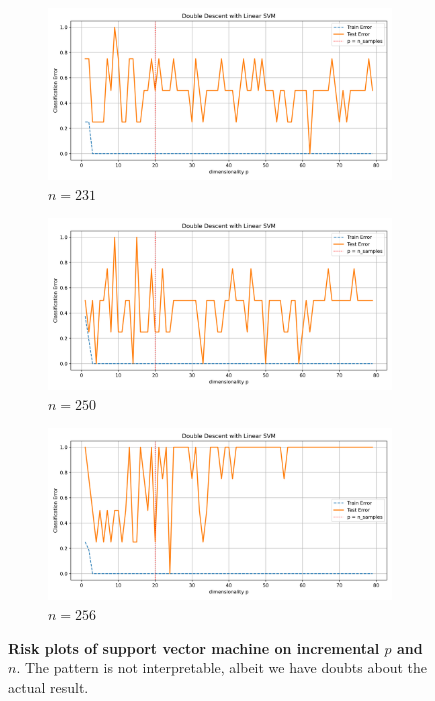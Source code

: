\documentclass{article}
\begin{document}
\begin{figure}[htb]
  \begin{subfigure}[b]{\imgwidth}
    \includegraphics[width=\linewidth]{img_qq/risk_curve_n150.png}
    \caption{$n=231$}\label{fig:2m1}
  \end{subfigure}%
  \hfill
  \begin{subfigure}[b]{\imgwidth}
    \includegraphics[width=\linewidth]{img_qq/risk_curve_n160.png}
    \caption{$n=250$}\label{fig:2n1}
  \end{subfigure}%
  \hfill
  \begin{subfigure}[b]{\imgwidth}
    \includegraphics[width=\linewidth]{img_qq/risk_curve_n170.png}
    \caption{$n=256$}\label{fig:2o1}
  \end{subfigure}%

  \caption{\textbf{Risk plots of support vector machine on incremental $p$ and $n$}. The pattern is not interpretable, albeit we have doubts about the actual result.}
  \label{fig:risk_all_grid_svm}
\end{figure}
\end{document}
